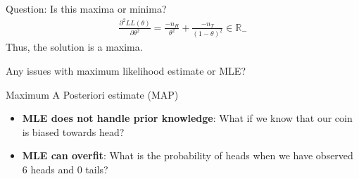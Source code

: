 \documentclass{beamer}
\newcommand{\data}{\mathcal{D}}
\begin{document}
%




\begin{frame}{}
Question: Is this maxima or minima?
\pause \begin{align*}
\frac{\partial^2 LL(\theta)}{\partial \theta^2} = \frac{-n_H}{\theta^2} + \frac{-n_T}{(1-\theta)^2} \in \mathbb R_-
\end{align*}
Thus, the solution is a maxima.

\pause Any issues with maximum likelihood estimate or MLE?



\end{frame}

\begin{frame}{Maximum A Posteriori estimate (MAP)}
\begin{itemize}


\item \textbf{MLE does not handle prior knowledge}: What if we know that our coin is biased towards head?
\item \textbf{MLE can overfit}: What is the probability of heads when we have observed 6 heads and 0 tails?
\end{itemize}

\end{frame}
\end{document}
